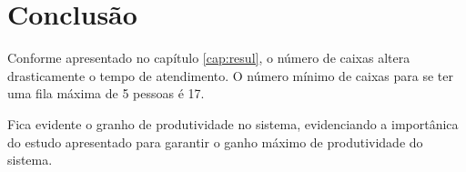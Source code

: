 \chapter{Conclusão}
Conforme apresentado no capítulo \ref{cap:resul}, o número
de caixas altera drasticamente o tempo de atendimento.
O número mínimo de caixas para se ter uma fila máxima de 5
pessoas é 17.

Fica evidente o granho de produtividade no sistema,
evidenciando a importânica do estudo apresentado para
garantir o ganho máximo de produtividade do sistema.

